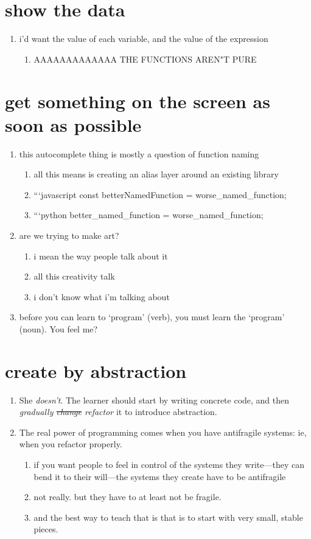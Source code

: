 \documentclass{article}
\begin{document}
	\section{show the data}
	\begin{enumerate}
		\item i'd want the value of each variable, and the value of the expression
		\begin{enumerate}
			\item AAAAAAAAAAAAA THE FUNCTIONS AREN"T PURE
		\end{enumerate}
	\end{enumerate}
	\section{get something on the screen as soon as possible}
	\begin{enumerate}
		\item this autocomplete thing is mostly a question of function naming
		\begin{enumerate}
			\item all this means is creating an alias layer around an existing library
			\item ```javascript const betterNamedFunction = worse\_named\_function;
			\item ```python better\_named\_function = worse\_named\_function;
		\end{enumerate}
		\item are we trying to make art?
		\begin{enumerate}
			\item i mean the way people talk about it
			\item all this creativity talk
			\item i don't know what i'm talking about
		\end{enumerate}
		\item before you can learn to `program' (verb), you must learn the `program' (noun). You feel me?
	\end{enumerate}
	\section{create by abstraction}
	\begin{enumerate}
		\item She \emph{doesn't}. The learner should start by writing concrete code, and then \emph{gradually \sout{change} refactor} it to introduce abstraction.
		\item The real power of programming comes when you have antifragile systems: ie, when you refactor properly.
		\begin{enumerate}
			\item if you want people to feel in control of the systems they write---they can bend it to their will---the systems they create have to be antifragile
			\item not really. but they have to at least not be fragile.
			\item and the best way to teach that is that is to start with very small, stable pieces.
		\end{enumerate}
	\end{enumerate}
\end{document}
